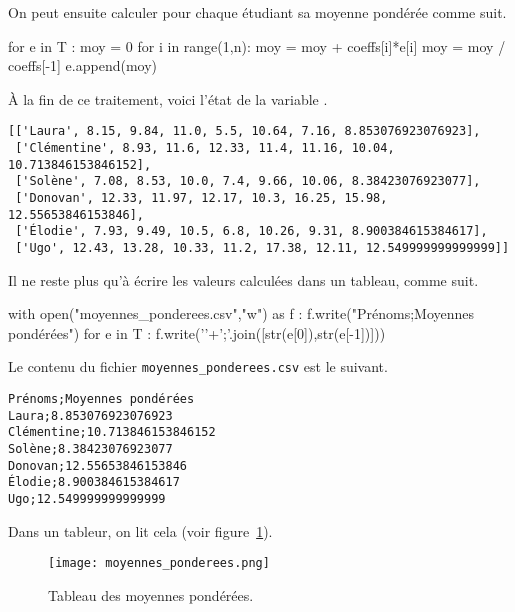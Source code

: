 On peut ensuite calculer pour chaque étudiant sa moyenne pondérée comme suit. 
\begin{pyverbatim}
for e in T : 
    moy = 0
    for i in range(1,n):
        moy = moy + coeffs[i]*e[i]
    moy = moy / coeffs[-1]
    e.append(moy)
\end{pyverbatim}
À la fin de ce traitement, voici l'état de la variable .
\begin{lstlisting}
[['Laura', 8.15, 9.84, 11.0, 5.5, 10.64, 7.16, 8.853076923076923], 
 ['Clémentine', 8.93, 11.6, 12.33, 11.4, 11.16, 10.04, 10.713846153846152], 
 ['Solène', 7.08, 8.53, 10.0, 7.4, 9.66, 10.06, 8.38423076923077], 
 ['Donovan', 12.33, 11.97, 12.17, 10.3, 16.25, 15.98, 12.55653846153846], 
 ['Élodie', 7.93, 9.49, 10.5, 6.8, 10.26, 9.31, 8.900384615384617], 
 ['Ugo', 12.43, 13.28, 10.33, 11.2, 17.38, 12.11, 12.549999999999999]]
\end{lstlisting}

Il ne reste plus qu'à écrire les valeurs calculées dans un tableau, comme suit. 
\begin{pyverbatim}
with open("moyennes_ponderees.csv","w") as f : 
    f.write("Prénoms;Moyennes pondérées")
    for e in T : 
        f.write('\n'+';'.join([str(e[0]),str(e[-1])]))
\end{pyverbatim}
Le contenu du fichier \texttt{moyennes\_ponderees.csv} est le suivant. 
\begin{lstlisting}
Prénoms;Moyennes pondérées
Laura;8.853076923076923
Clémentine;10.713846153846152
Solène;8.38423076923077
Donovan;12.55653846153846
Élodie;8.900384615384617
Ugo;12.549999999999999
\end{lstlisting}
Dans un tableur, on lit cela (voir figure~\ref{07:tab:moyennes_ponderees}).
\begin{figure}[h!]
    \begin{center}
        \texttt{[image: moyennes\_ponderees.png]}
    \end{center}
    \caption{Tableau des moyennes pondérées.}
    \label{07:tab:moyennes_ponderees}
\end{figure}


%  

%  

%  


% 
% 
